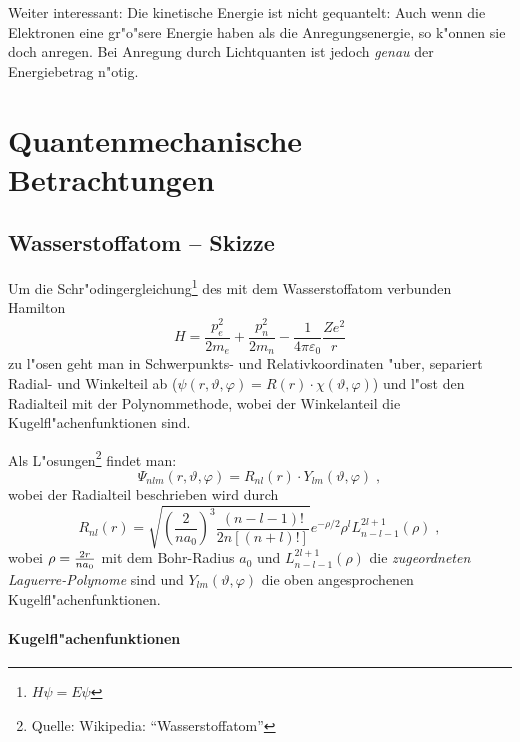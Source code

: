 \documentclass[a4paper,draft]{article}
\begin{document}
\abs
Weiter interessant: Die kinetische Energie ist nicht gequantelt: Auch
wenn die Elektronen eine gr"o"sere Energie haben als die
Anregungsenergie, so k"onnen sie doch anregen. Bei Anregung durch
Lichtquanten ist jedoch \emph{genau} der Energiebetrag n"otig.











\section{Quantenmechanische Betrachtungen}
\label{sec:quantenmechanische_betrachtungen}


\subsection{Wasserstoffatom -- Skizze}
\label{sec:wasserstoffatom}

Um die Schr"odingergleichung\footnote{$H\psi = E\psi$} des mit dem
Wasserstoffatom verbunden Hamilton
\begin{equation}
  \label{eq:Hamilton_h-atom}
  H = \frac{p_e^2}{2m_e} + \frac{p_n^2}{2m_n} -
  \frac{1}{4\pi\varepsilon_0} \frac{Ze^2}{r}
\end{equation}
zu l"osen geht man in Schwerpunkts- und Relativkoordinaten "uber,
separiert Radial- und Winkelteil ab ($\psi(r,\vartheta,\varphi) = R(r)
\cdot \chi(\vartheta,\varphi)$) und l"ost den Radialteil mit der
Polynommethode, wobei der Winkelanteil die Kugelfl"achenfunktionen sind.


Als L"osungen\footnote{Quelle: Wikipedia: "`Wasserstoffatom"'} findet
man:
\begin{equation*}
  \Psi_{nlm}(r,\vartheta,\varphi) = R_{nl}(r) \cdot Y_{lm}(\vartheta,
  \varphi )  \;,
\end{equation*}
wobei der Radialteil beschrieben wird durch
\begin{equation*}
  R_{nl}(r) = \sqrt {{\left(\frac{2}{n
          a_0}\right)}^3\frac{(n-l-1)!}{2n[(n+l)!]} } e^{- \rho / 2}
  \rho^{l} L_{n-l-1}^{2l+1}(\rho) \;,
\end{equation*}
wobei $ \rho = {2r \over {n a_0}} $ mit dem Bohr-Radius $a_0$ und $
L_{n-l-1}^{2l+1}(\rho) $ die \emph{zugeordneten Laguerre-Polynome}
sind und $Y_{lm}(\vartheta, \varphi ) $ die oben angesprochenen
Kugelfl"achenfunktionen.

\paragraph{Kugelfl"achenfunktionen}
\label{sec:kugelflachenfunktionen}
\end{document}
